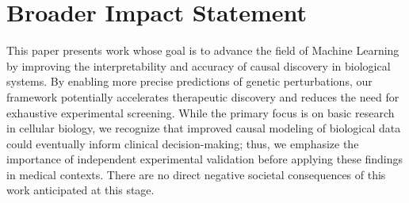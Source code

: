 \documentclass{article}
\begin{document}


\section*{Broader Impact Statement}
This paper presents work whose goal is to advance the field of Machine Learning by improving the interpretability and accuracy of causal discovery in biological systems. 
By enabling more precise \insilico{} predictions of genetic perturbations, our framework potentially accelerates therapeutic discovery and reduces the need for exhaustive experimental screening. 
While the primary focus is on basic research in cellular biology, we recognize that improved causal modeling of biological data could eventually inform clinical decision-making; thus, we emphasize the importance of independent experimental validation before applying these findings in medical contexts. 
There are no direct negative societal consequences of this work anticipated at this stage.




\newpage
\appendix
\onecolumn

\end{document}
